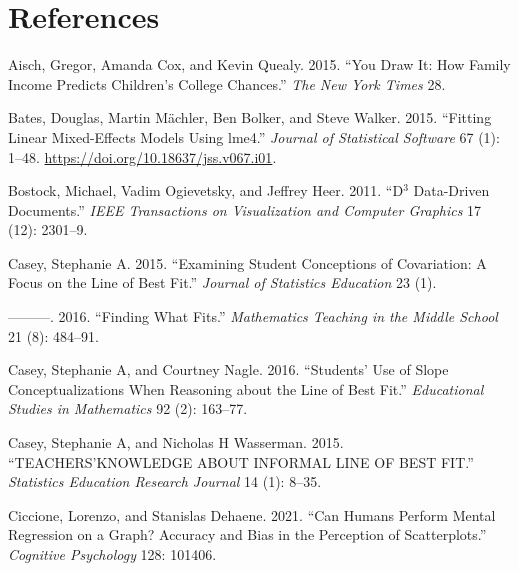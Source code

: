 \documentclass[
]{jds}
\newlength{\cslhangindent}
\newlength{\cslentryspacingunit} %
\newenvironment{CSLReferences}[2] %
 {%
  \setlength{\parindent}{0pt}
  \ifodd #1
  \let\oldpar\par
  \def\par{\hangindent=\cslhangindent\oldpar}
  \fi
  \setlength{\parskip}{#2\cslentryspacingunit}
 }%
 {}
\begin{document}
\hypertarget{references}{%
\section*{References}\label{references}}

\hypertarget{refs}{}
\begin{CSLReferences}{1}{0}
\leavevmode{}%
Aisch, Gregor, Amanda Cox, and Kevin Quealy. 2015. {``You Draw It: How
Family Income Predicts Children's College Chances.''} \emph{The New York
Times} 28.

\leavevmode{}%
Bates, Douglas, Martin Mächler, Ben Bolker, and Steve Walker. 2015.
{``Fitting Linear Mixed-Effects Models Using {lme4}.''} \emph{Journal of
Statistical Software} 67 (1): 1--48.
\url{https://doi.org/10.18637/jss.v067.i01}.

\leavevmode{}%
Bostock, Michael, Vadim Ogievetsky, and Jeffrey Heer. 2011. {``D\(^3\)
Data-Driven Documents.''} \emph{IEEE Transactions on Visualization and
Computer Graphics} 17 (12): 2301--9.

\leavevmode{}%
Casey, Stephanie A. 2015. {``Examining Student Conceptions of
Covariation: A Focus on the Line of Best Fit.''} \emph{Journal of
Statistics Education} 23 (1).

\leavevmode{}%
---------. 2016. {``Finding What Fits.''} \emph{Mathematics Teaching in
the Middle School} 21 (8): 484--91.

\leavevmode{}%
Casey, Stephanie A, and Courtney Nagle. 2016. {``Students' Use of Slope
Conceptualizations When Reasoning about the Line of Best Fit.''}
\emph{Educational Studies in Mathematics} 92 (2): 163--77.

\leavevmode{}%
Casey, Stephanie A, and Nicholas H Wasserman. 2015.
{``TEACHERS'KNOWLEDGE ABOUT INFORMAL LINE OF BEST FIT.''}
\emph{Statistics Education Research Journal} 14 (1): 8--35.

\leavevmode{}%
Ciccione, Lorenzo, and Stanislas Dehaene. 2021. {``Can Humans Perform
Mental Regression on a Graph? Accuracy and Bias in the Perception of
Scatterplots.''} \emph{Cognitive Psychology} 128: 101406.


\end{CSLReferences}
\end{document}

